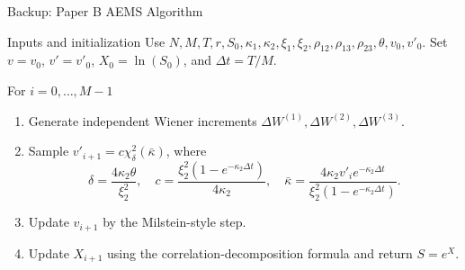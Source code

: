 \begin{frame}{Backup: Paper B AEMS Algorithm}
  \scriptsize
  \begin{block}{Inputs and initialization}
    Use \(N,M,T,r,S_0,\kappa_1,\kappa_2,\xi_1,\xi_2,\rho_{12},\rho_{13},\rho_{23},\theta,v_0,v'_0\). Set \(v=v_0\), \(v'=v'_0\), \(X_0=\ln(S_0)\), and \(\Delta t=T/M\).
  \end{block}
  \begin{block}{For \(i=0,\ldots,M-1\)}
    \begin{enumerate}
      \item Generate independent Wiener increments \(\Delta W^{(1)},\Delta W^{(2)},\Delta W^{(3)}\).
      \item Sample \(v'_{i+1}=c\chi^2_\delta(\bar\kappa)\), where
      \[
      \delta=\frac{4\kappa_2\theta}{\xi_2^2},\quad
      c=\frac{\xi_2^2(1-e^{-\kappa_2\Delta t})}{4\kappa_2},\quad
      \bar\kappa=\frac{4\kappa_2v'_ie^{-\kappa_2\Delta t}}{\xi_2^2(1-e^{-\kappa_2\Delta t})}.
      \]
      \item Update \(v_{i+1}\) by the Milstein-style step.
      \item Update \(X_{i+1}\) using the correlation-decomposition formula and return \(S=e^X\).
    \end{enumerate}
  \end{block}
\end{frame}

